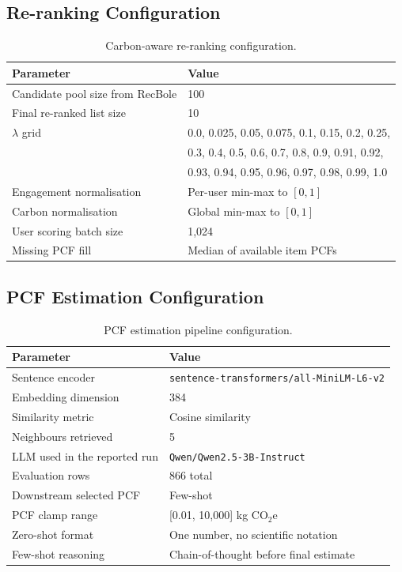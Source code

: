 \documentclass[11pt]{article}
\begin{document}
\begin{appendices}
\subsection*{Re-ranking Configuration}

\begin{table}[H]
\centering
\small
\begin{tabular}{ll}
\hline
Parameter & Value \\
\hline
Candidate pool size from RecBole & 100 \\
Final re-ranked list size & 10 \\
$\lambda$ grid & 0.0, 0.025, 0.05, 0.075, 0.1, 0.15, 0.2, 0.25, \\
               & 0.3, 0.4, 0.5, 0.6, 0.7, 0.8, 0.9, 0.91, 0.92, \\
               & 0.93, 0.94, 0.95, 0.96, 0.97, 0.98, 0.99, 1.0 \\
Engagement normalisation & Per-user min-max to $[0,1]$ \\
Carbon normalisation     & Global min-max to $[0,1]$ \\
User scoring batch size  & 1{,}024 \\
Missing PCF fill         & Median of available item PCFs \\
\hline
\end{tabular}
\caption{Carbon-aware re-ranking configuration.}
\label{tab:reranking-config}
\end{table}

\subsection*{PCF Estimation Configuration}

\begin{table}[H]
\centering
\small
\begin{tabular}{ll}
\hline
Parameter & Value \\
\hline
Sentence encoder        & \texttt{sentence-transformers/all-MiniLM-L6-v2} \\
Embedding dimension     & 384 \\
Similarity metric       & Cosine similarity \\
Neighbours retrieved    & 5 \\
LLM used in the reported run & \texttt{Qwen/Qwen2.5-3B-Instruct} \\
Evaluation rows         & 866 total  \\
Downstream selected PCF & Few-shot \\
PCF clamp range         & [0.01, 10{,}000] kg CO$_2$e \\
Zero-shot format        & One number, no scientific notation \\
Few-shot reasoning      & Chain-of-thought before final estimate \\
\hline
\end{tabular}
\caption{PCF estimation pipeline configuration.}
\label{tab:pcf-config}
\end{table}


\end{appendices}
\end{document}
